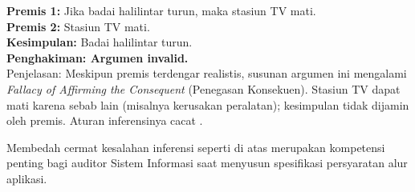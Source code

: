 \begin{contoh}
\textbf{Premis 1:} Jika badai halilintar turun, maka stasiun TV mati. \\
\textbf{Premis 2:} Stasiun TV mati. \\
\textbf{Kesimpulan:} Badai halilintar turun. \\
\textbf{Penghakiman: Argumen invalid.} \\
Penjelasan: Meskipun premis terdengar realistis, susunan argumen ini mengalami \textit{Fallacy of Affirming the Consequent} (Penegasan Konsekuen). Stasiun TV dapat mati karena sebab lain (misalnya kerusakan peralatan); kesimpulan tidak dijamin oleh premis. Aturan inferensinya cacat \cite{iep_natded}.
\end{contoh}
Membedah cermat kesalahan inferensi seperti di atas merupakan kompetensi penting bagi auditor Sistem Informasi saat menyusun spesifikasi persyaratan alur aplikasi. 
